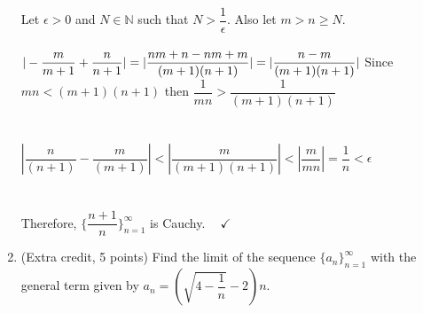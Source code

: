 \documentclass[fleqn]{article}
\begin{document}
\begin{enumerate}
      \textcolor{hwColor}{
        Let $\epsilon>0$ and $N \in \mathbb{N}$ such that $N >\dfrac{1}{\epsilon}$. Also let $m>n\geq N$.
        \\
        \\
        $
          |-\dfrac{m}{m+1}+\dfrac{n}{n+1}|=|\dfrac{nm+n-nm+m}{(m+1)(n+1)}|
          =|\dfrac{n-m}{(m+1)(n+1)}|
          \\
          \\
          \\
        $ 
        Since $mn<(m+1)(n+1)$ then $\dfrac{1}{mn}>\dfrac{1}{(m+1)(n+1)}$
        \\
        \\
        \\
        $
          |\dfrac{n}{(n+1)}-\dfrac{m}{(m+1)}|<|\dfrac{m}{(m+1)(n+1)}|<|\dfrac{m}{mn}|=\dfrac{1}{n}<\epsilon
        $
        \\
        \\
        \\
        Therefore, $\{\dfrac{n+1}{n}\}_{n=1}^{\infty}$ is Cauchy. $~~~~ \checkmark$
      }


    \item (Extra credit, 5 points) Find the limit of the sequence $\{a_n\}_{n=1}^{\infty}$ with the general term given by 
    $a_n=\left(\sqrt{4-\dfrac{1}{n}}-2\right)n$.



  \end{enumerate}
\end{document}
